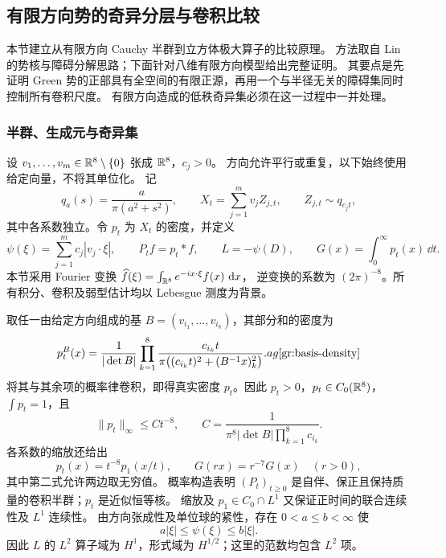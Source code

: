 \subsection{有限方向势的奇异分层与卷积比较}
\label{gr:sec}

本节建立从有限方向 Cauchy 半群到立方体极大算子的比较原理。
方法取自 Lin 的势核与障碍分解思路\cite{Lin2026}；下面针对八维有限方向模型给出完整证明。
其要点是先证明 Green 势的正部具有全空间的有限正源，再用一个与半径无关的障碍集同时控制所有卷积尺度。
有限方向造成的低秩奇异集必须在这一过程中一并处理。

\subsubsection{半群、生成元与奇异集}

设 $v_1,\ldots,v_m\in\mathbb{R}^8\setminus\{0\}$ 张成 $\mathbb{R}^8$，$c_j>0$。
方向允许平行或重复，以下始终使用给定向量，不将其单位化。
记
\[
 q_a(s)=\frac{a}{\pi(a^2+s^2)},\qquad
 X_t=\sum_{j=1}^m v_jZ_{j,t},
 \qquad Z_{j,t}\sim q_{c_jt},
\]
其中各系数独立。令 $p_t$ 为 $X_t$ 的密度，并定义
\begin{equation}\label{gr:objects}
 \psi(\xi)=\sum_{j=1}^m c_j|v_j\cdot\xi|,
 \qquad P_tf=p_t*f,\qquad L=-\psi(D),
 \qquad G(x)=\int_0^\infty p_t(x)\,\dd t.
\end{equation}
本节采用 Fourier 变换
$\widehat f(\xi)=\int_{\mathbb{R}^8}e^{-ix\cdot\xi}f(x)\,\,\mathrm d x$，
逆变换的系数为 $(2\pi)^{-8}$。所有积分、卷积及弱型估计均以 Lebesgue 测度为背景。

取任一由给定方向组成的基 $B=(v_{i_1},\ldots,v_{i_8})$，其部分和的密度为
\begin{equation}\label{gr:basis-density}
 p_t^B(x)=\frac1{|\det B|}
 \prod_{k=1}^8\frac{c_{i_k}t}
 {\pi\bigl((c_{i_k}t)^2+(B^{-1}x)_k^2\bigr)}.
	ag{\ref{gr:basis-density}}
\end{equation}
将其与其余项的概率律卷积，即得真实密度 $p_t$。因此 $p_t>0$，$p_t\in C_0(\mathbb{R}^8)$，$\int p_t=1$，且
\begin{equation}\label{gr:global-density}
 \|p_t\|_\infty\le Ct^{-8},\qquad
 C=\frac1{\pi^8|\det B|\prod_{k=1}^8c_{i_k}}.
\end{equation}
各系数的缩放还给出
\begin{equation}\label{gr:scaling}
 p_t(x)=t^{-8}p_1(x/t),\qquad G(rx)=r^{-7}G(x)\quad(r>0),
\end{equation}
其中第二式允许两边取无穷值。
概率构造表明 $(P_t)_{t\ge0}$ 是自伴、保正且保持质量的卷积半群；$p_t$ 是近似恒等核。
缩放及 $p_1\in C_0\cap L^1$ 又保证正时间的联合连续性及 $L^1$ 连续性。
由方向张成性及单位球的紧性，存在 $0<a\le b<\infty$ 使
\begin{equation}\label{gr:ellipticity}
 a|\xi|\le\psi(\xi)\le b|\xi|.
\end{equation}
因此 $L$ 的 $L^2$ 算子域为 $H^1$，形式域为 $H^{1/2}$；这里的范数均包含 $L^2$ 项。

